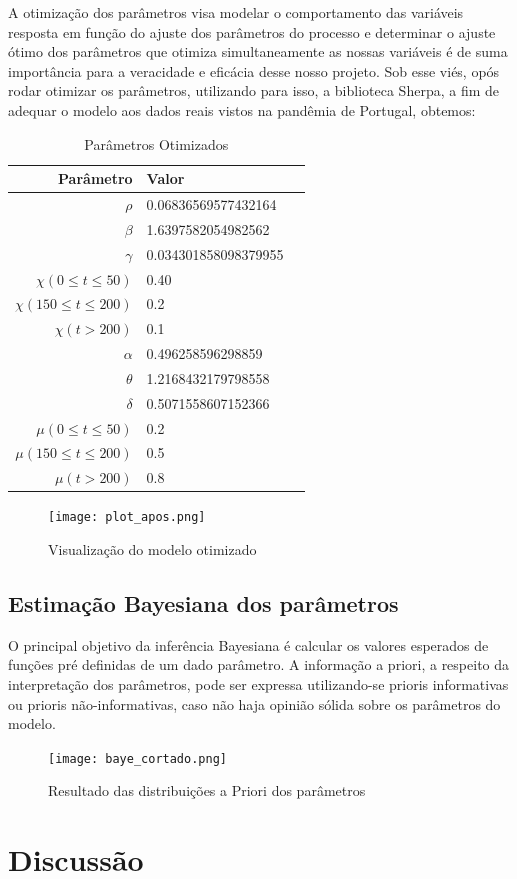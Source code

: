 \documentclass[12pt]{article}
\begin{document}
A otimização dos parâmetros visa modelar o comportamento das variáveis resposta em função do ajuste dos parâmetros do processo e determinar o ajuste ótimo dos parâmetros que otimiza simultaneamente as nossas variáveis é de suma importância para a veracidade e eficácia desse nosso projeto. Sob esse viés, opós rodar otimizar os parâmetros, utilizando para isso, a biblioteca Sherpa, a fim de adequar o modelo aos dados reais vistos na pandêmia de Portugal, obtemos:
\begin{table}[h]
\centering
\caption{Parâmetros Otimizados}
\vspace{0.5cm}
\begin{tabular}{r|lr}

Parâmetro & Valor\\ %
\hline                               %
$\rho $ & 0.06836569577432164      \\
$\beta $ & 1.6397582054982562  \\
$\gamma$ & 0.034301858098379955           \\
$\chi(0 \leq t \leq 50)$ & 0.40      \\
$\chi(150 \leq t \leq 200)$ & 0.2      \\
$\chi(t > 200)$ & 0.1      \\
$\alpha$ & 0.496258596298859 \\
$ \theta $ & 1.2168432179798558 \\
$ \delta$ & 0.5071558607152366\\
$\mu(0 \leq t \leq 50)$ & 0.2     \\
$\mu(150 \leq t \leq 200)$ & 0.5       \\
$\mu(t > 200)$ & 0.8      \\
\end{tabular}
\end{table}

\begin{figure}[!h]
    \centering
    \texttt{[image: plot\_apos.png]}
    \caption{Visualização do modelo otimizado}
\end{figure}

\newpage
\subsection{Estimação Bayesiana dos parâmetros}

O principal objetivo da inferência Bayesiana é calcular os valores esperados de funções pré definidas de um dado parâmetro. A informação a priori, a respeito da interpretação dos parâmetros, pode ser expressa utilizando-se prioris informativas ou prioris não-informativas, caso não haja opinião sólida sobre os parâmetros do modelo.
\begin{figure}[!h]
    \centering
    \texttt{[image: baye\_cortado.png]}
    \caption{Resultado das distribuições a Priori dos parâmetros}
\end{figure}
{\large \section{Discussão} }
\end{document}
